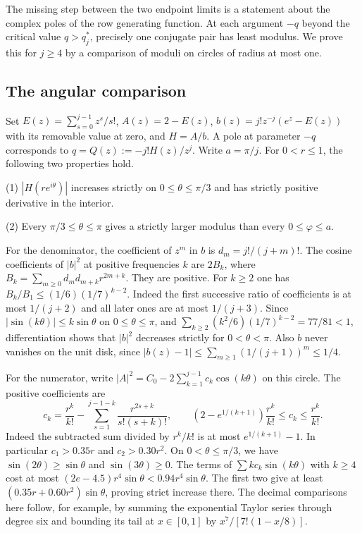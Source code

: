 \documentclass[11pt]{article}
\begin{document}
The missing step between the two endpoint limits is a statement about the complex poles of the row generating function. At each argument $-q$ beyond the critical value $q>q_j^*$, precisely one conjugate pair has least modulus. We prove this for $j\ge4$ by a comparison of moduli on circles of radius at most one.

\subsection{The angular comparison}

Set $E(z)=\sum_{s=0}^{j-1}z^s/s!$, $A(z)=2-E(z)$, $b(z)=j!z^{-j}(e^z-E(z))$ with its removable value at zero, and $H=A/b$. A pole at parameter $-q$ corresponds to $q=Q(z):=-j!H(z)/z^j$. Write $a=\pi/j$. For $0<r\le1$, the following two properties hold.

\par\noindent (1) $|H(re^{i\theta})|$ increases strictly on $0\le\theta\le\pi/3$ and has strictly positive derivative in the interior.
\par\noindent (2) Every $\pi/3\le\theta\le\pi$ gives a strictly larger modulus than every $0\le\varphi\le a$.

For the denominator, the coefficient of $z^m$ in $b$ is $d_m=j!/(j+m)!$. The cosine coefficients of $|b|^2$ at positive frequencies $k$ are $2B_k$, where $B_k=\sum_{m\ge0}d_m d_{m+k} r^{2m+k}$. They are positive. For $k\ge2$ one has $B_k/B_1\le (1/6)(1/7)^{k-2}$. Indeed the first successive ratio of coefficients is at most $1/(j+2)$ and all later ones are at most $1/(j+3)$. Since $|\sin(k\theta)|\le k\sin\theta$ on $0\le\theta\le\pi$, and $\sum_{k\ge2}(k^2/6)(1/7)^{k-2}=77/81<1$, differentiation shows that $|b|^2$ decreases strictly for $0<\theta<\pi$. Also $b$ never vanishes on the unit disk, since $|b(z)-1|\le\sum_{m\ge1}(1/(j+1))^m\le1/4$.

For the numerator, write $|A|^2=C_0-2\sum_{k=1}^{j-1}c_k\cos(k\theta)$ on this circle. The positive coefficients are
\[
c_k=\frac{r^k}{k!}-
 \sum_{s=1}^{j-1-k}\frac{r^{2s+k}}{s!(s+k)!},\qquad
 (2-e^{1/(k+1)})\frac{r^k}{k!}\le c_k\le\frac{r^k}{k!}.
\]
Indeed the subtracted sum divided by $r^k/k!$ is at most $e^{1/(k+1)}-1$. In particular $c_1>0.35r$ and $c_2>0.30r^2$. On $0<\theta\le\pi/3$, we have $\sin(2\theta)\ge\sin\theta$ and $\sin(3\theta)\ge0$. The terms of $\sum k c_k\sin(k\theta)$ with $k\ge4$ cost at most $(2e-4.5)r^4\sin\theta<0.94r^4\sin\theta$. The first two give at least $(0.35r+0.60r^2)\sin\theta$, proving strict increase there. The decimal comparisons here follow, for example, by summing the exponential Taylor series through degree six and bounding its tail at $x\in[0,1]$ by $x^7/[7!(1-x/8)]$.
\end{document}
